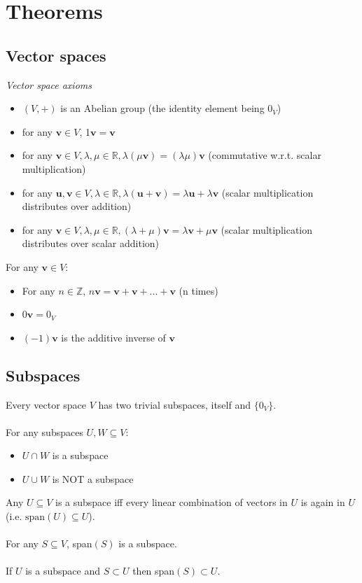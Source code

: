 \documentclass{article}
\newcommand{\R}{\mathbb{R}}
\newcommand{\Z}{\mathbb{Z}}
\renewcommand{\vec}[1]{\mathbf{#1}}
\begin{document}
\section{Theorems}

\subsection{Vector spaces}
\textit{Vector space axioms}
\begin{itemize}
\item $ (V, +) $ is an Abelian group (the identity element being $ 0_{V} $)
\item for any $ \vec{v} \in V $, 1$ \vec{v} = \vec{v} $
\item for any $ \vec{v} \in V, \lambda, \mu \in \R, \lambda (\mu \vec{v}) = (\lambda \mu) \vec{v} $ (commutative w.r.t. scalar multiplication)
\item for any $ \vec{u}, \vec{v} \in V, \lambda \in \R, \lambda (\vec{u}  + \vec{v}) = \lambda \vec{u}  + \lambda \vec{v} $ (scalar multiplication distributes over addition)
\item for any $ \vec{v} \in V, \lambda, \mu \in \R, (\lambda + \mu) \vec{v} = \lambda \vec{v}  + \mu \vec{v} $ (scalar multiplication distributes over scalar addition)
\end{itemize}
For any $ \vec{v} \in V $:
\begin{itemize}
\item For any $ n \in \Z $, $ n\vec{v} = \vec{v} + \vec{v} + ... + \vec{v} $ (n times)
\item $ 0 \vec{v} = 0_{V} $
\item $ (-1) \vec{v} $ is the additive inverse of $ \vec{v} $
\end{itemize}

\subsection{Subspaces}
Every vector space $ V $ has two trivial subspaces, itself and $ \{ 0_{V} \} $.
\\\\
For any subspaces $ U, W \subseteq V $:
\begin{itemize}
\item $ U \cap W $ is a subspace
\item $ U \cup W $ is NOT a subspace
\end{itemize}
Any $ U \subseteq V $ is a subspace iff every linear combination of vectors in $ U $ is again in $ U $ (i.e. $ \textrm{span}(U) \subseteq U $).
\\\\
For any $ S \subseteq V $, span$ (S) $ is a subspace.
\\\\
If $ U $ is a subspace and $ S \subset U $ then span$ (S) \subset U $.
\end{document}
